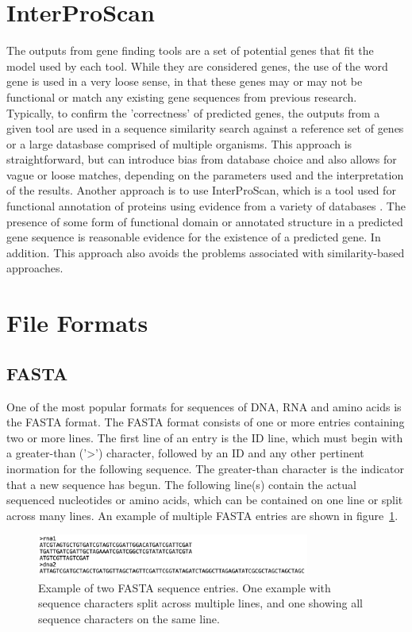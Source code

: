 \section{InterProScan}
The outputs from gene finding tools are a set of potential genes that
fit the model used by each tool. While they are considered genes, the
use of the word gene is used in a very loose sense, in that these
genes may or may not be functional or match any existing gene
sequences from previous research. Typically, to confirm the
'correctness' of predicted genes, the outputs from a given tool are
used in a sequence similarity search against a reference set of genes
or a large datasbase comprised of multiple organisms. This approach is
straightforward, but can introduce bias from database choice and also
allows for vague or loose matches, depending on the parameters used
and the interpretation of the results. Another approach is to use
InterProScan, which is a tool used for functional annotation of
proteins using evidence from a variety of databases
\cite{10.1093/nar/gkac993}. The presence of some form of functional
domain or annotated structure in a predicted gene sequence is
reasonable evidence for the existence of a predicted gene. In
addition. This approach also avoids the problems associated with
similarity-based approaches.


\section{File Formats}

\subsection{FASTA}
One of the most popular formats for sequences of DNA, RNA and amino
acids is the FASTA format. The FASTA format consists of one or more
entries containing two or more lines. The first line of an entry is
the ID line, which must begin with a greater-than ('>') character,
followed by an ID and any other pertinent inormation for the following
sequence. The greater-than character is the indicator that a new
sequence has begun. The following line(s) contain the actual sequenced
nucleotides or amino acids, which can be contained on one line or
split across many lines. An example of multiple FASTA entries are
shown in figure~\ref{fig:fasta-example}.

\begin{figure}
  \centering
  \includegraphics[width=0.8\textwidth]{figures/fasta-example.png}
  \caption{Example of two FASTA sequence entries. One example with
    sequence characters split across multiple lines, and one showing
    all sequence characters on the same line.}
  \label{fig:fasta-example}
\end{figure}

